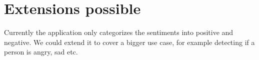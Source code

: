 
\chapter{Extensions possible} %

\label{ChapterX} %




Currently the application only categorizes the sentiments into positive and negative. We could extend it to cover a bigger use case, for example detecting if a person is angry, sad etc.

